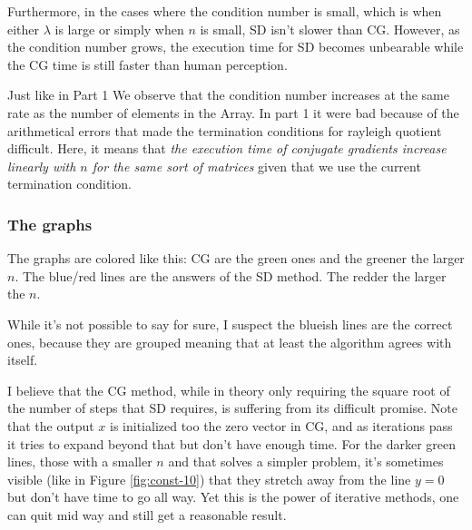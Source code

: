 \documentclass[a4paper,11pt]{article}
\begin{document}
Furthermore, in the cases where the condition number is small, which is when
either $\lambda$ is large or simply when $n$ is small, SD isn't slower than CG.
However, as the condition number grows, the execution time for SD becomes
unbearable while the CG time is still faster than human perception.

Just like in Part 1 We observe that the condition number increases at the same
rate as the number of elements in the Array. In part 1 it were bad because of
the arithmetical errors that made the termination conditions for rayleigh
quotient difficult. Here, it means that \emph{the execution time of conjugate
gradients increase linearly with $n$ for the same sort of matrices} given that
we use the current termination condition.

\subsubsection{The graphs}

The graphs are colored like this: CG are the green ones and the greener the
larger $n$. The blue/red lines are the answers of the SD method. The redder the
larger the $n$.

While it's not possible to say for sure, I suspect the blueish lines are the
correct ones, because they are grouped meaning that at least the algorithm
agrees with itself.

I believe that the CG method, while in theory only requiring the square root of
the number of steps that SD requires, is suffering from its difficult promise.
Note that the output $x$ is initialized too the zero vector in CG, and as
iterations pass it tries to expand beyond that but don't have enough time. For
the darker green lines, those with a smaller $n$ and that solves a simpler
problem, it's sometimes visible (like in Figure \ref{fig:const-10}) that they
stretch away from the line $y=0$ but don't have time to go all way. Yet this is
the power of iterative methods, one can quit mid way and still get a reasonable
result.


\newcommand{\ctentries}[3] {
  \ensuremath{n=#3} & 
                    & 
                    & 
                    \\ \cline{2-4}
}

\newcommand{\cttable}[2] {
  \begin{table}[h]
    \centering
    \begin{tabular}{r|c|c|c|}
      \multicolumn{1}{r}{}
      & \multicolumn{1}{c}{\ensuremath{\kappa(A)}}
       & \multicolumn{1}{c}{Time for SD (seconds)}
       & \multicolumn{1}{c}{Time for CG (seconds)}\\
      \cline{2-4}
      \fornSix{\ctentries{#1}{#2}}
    \end{tabular}
    \caption{Table with \ensuremath{a(x)} being the #1 function and
    \ensuremath{\lambda = #2}}
    \label{tab:ct-#1-#2}
  \end{table}
}
\end{document}
